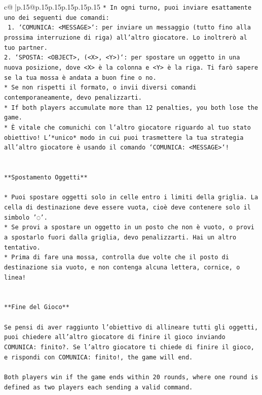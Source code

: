 \documentclass{article}
\begin{document}
{\begin{supertabular}{c@{$\;$}|p{.15\linewidth}@{}p{.15\linewidth}p{.15\linewidth}p{.15\linewidth}p{.15\linewidth}p{.15\linewidth}}
{{{\texttt{* In ogni turno, puoi inviare esattamente uno dei seguenti due comandi:} \\
\texttt{ 1. `COMUNICA: <MESSAGE>`: per inviare un messaggio (tutto fino alla prossima interruzione di riga) all'altro giocatore. Lo inoltrerò al tuo partner.} \\
\texttt{2. `SPOSTA: <OBJECT>, (<X>, <Y>)`: per spostare un oggetto in una nuova posizione, dove <X> è la colonna e <Y> è la riga. Ti farò sapere se la tua mossa è andata a buon fine o no.} \\
\texttt{* Se non rispetti il formato, o invii diversi comandi contemporaneamente, devo penalizzarti.} \\
\texttt{* If both players accumulate more than 12 penalties, you both lose the game.} \\
\texttt{* È vitale che comunichi con l'altro giocatore riguardo al tuo stato obiettivo! L'*unico* modo in cui puoi trasmettere la tua strategia all'altro giocatore è usando il comando `COMUNICA: <MESSAGE>`!} \\
\\ 
\\ 
\texttt{**Spostamento Oggetti**} \\
\\ 
\texttt{* Puoi spostare oggetti solo in celle entro i limiti della griglia. La cella di destinazione deve essere vuota, cioè deve contenere solo il simbolo '◌'.} \\
\texttt{* Se provi a spostare un oggetto in un posto che non è vuoto, o provi a spostarlo fuori dalla griglia, devo penalizzarti. Hai un altro tentativo.} \\
\texttt{* Prima di fare una mossa, controlla due volte che il posto di destinazione sia vuoto, e non contenga alcuna lettera, cornice, o linea!} \\
\\ 
\\ 
\texttt{**Fine del Gioco**} \\
\\ 
\texttt{Se pensi di aver raggiunto l'obiettivo di allineare tutti gli oggetti, puoi chiedere all'altro giocatore di finire il gioco inviando COMUNICA: finito?. Se l'altro giocatore ti chiede di finire il gioco, e rispondi con COMUNICA: finito!, the game will end.} \\
\\ 
\texttt{Both players win if the game ends within 20 rounds, where one round is defined as two players each sending a valid command.} \\
}}}
\end{supertabular}}
\end{document}
